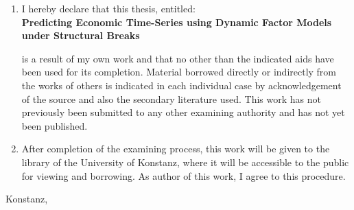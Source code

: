 \documentclass[12pt]{article}
\begin{document}
\raggedright
\begin{enumerate}
\item{I hereby declare that this thesis, entitled: \\
\vspace{0.5cm}
\textbf{Predicting Economic Time-Series using Dynamic Factor Models under Structural Breaks}

is a result of my own work and that no other than the indicated aids have been used for
its completion. Material borrowed directly or indirectly from the works of others is
indicated in each individual case by acknowledgement of the source and also the
secondary literature used.
This work has not previously been submitted to any other examining authority and has
not yet been published.
}

\item{After completion of the examining process, this work will be given to the library of the
University of Konstanz, where it will be accessible to the public for viewing and borrowing. As author of this work, I agree to this procedure.}
\end{enumerate}

\vspace{1cm}
Konstanz, \underline{\hspace{4cm}} \hspace{3cm} \underline{\hspace{6cm}}
\\
\vspace{1cm}
\end{document}
